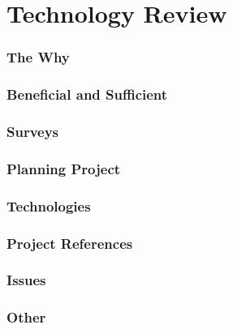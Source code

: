 \chapter{Technology Review}

\subsection{The Why}

\subsection{Beneficial and Sufficient}

\subsection{Surveys}

\subsection{Planning Project}

\subsection{Technologies}

\subsection{Project References}

\subsection{Issues}

\subsection{Other}